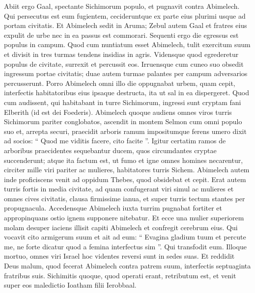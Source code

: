 \begin{biblechapter}
\begin{biblechapter}
\begin{biblechapter}
\begin{biblechapter}
\begin{biblechapter}
\begin{biblechapter}
\begin{biblechapter}
\begin{biblechapter}
\begin{biblechapter}
\verse Abiit ergo Gaal, spectante Sichimorum populo, et pugnavit contra Abimelech. 
\verse Qui persecutus est eum fugientem, cecideruntque ex parte eius plurimi usque ad portam civitatis. 
\verse Et Abimelech sedit in Aruma; Zebul autem Gaal et fratres eius expulit de urbe nec in ea passus est commorari.
 \verse Sequenti ergo die egressus est populus in campum. Quod cum nuntiatum esset Abimelech, 
\verse tulit exercitum suum et divisit in tres turmas tendens insidias in agris. Vidensque quod egrederetur populus de civitate, surrexit et percussit eos. 
\verse Irruensque cum cuneo suo obsedit ingressum portae civitatis; duae autem turmae palantes per campum adversarios percusserunt. 
 \verse Porro Abimelech omni illo die oppugnabat urbem, quam cepit, interfectis habitatoribus eius ipsaque destructa, ita ut sal in ea dispergeret.
 \verse Quod cum audissent, qui habitabant in turre Sichimorum, ingressi sunt cryptam fani Elberith (id est dei Foederis). 
\verse Abimelech quoque audiens omnes viros turris Sichimorum pariter conglobatos, 
\verse ascendit in montem Selmon cum omni populo suo et, arrepta securi, praecidit arboris ramum impositumque ferens umero dixit ad socios: “ Quod me viditis facere, cito facite ”. 
\verse Igitur certatim ramos de arboribus praecidentes sequebantur ducem, quos circumdantes cryptae succenderunt; atque ita factum est, ut fumo et igne omnes homines necarentur, circiter mille viri pariter ac mulieres, habitatores turris Sichem.
 \verse Abimelech autem inde proficiscens venit ad oppidum Thebes, quod obsidebat et cepit. 
\verse Erat autem turris fortis in media civitate, ad quam confugerant viri simul ac mulieres et omnes cives civitatis, clausa firmissime ianua, et super turris tectum stantes per propugnacula. 
\verse Accedensque Abimelech iuxta turrim pugnabat fortiter et appropinquans ostio ignem supponere nitebatur.
 \verse Et ecce una mulier superiorem molam desuper iaciens illisit capiti Abimelech et confregit cerebrum eius. 
\verse Qui vocavit cito armigerum suum et ait ad eum: “ Evagina gladium tuum et percute me, ne forte dicatur quod a femina interfectus sim ”. Qui transfodit eum. 
\verse Illoque mortuo, omnes viri Israel hoc videntes reversi sunt in sedes suas. 
\verse Et reddidit Deus malum, quod fecerat Abimelech contra patrem suum, interfectis septuaginta fratribus suis. 
 \verse Sichimitis quoque, quod operati erant, retributum est, et venit super eos maledictio Ioatham filii Ierobbaal.
 

\end{biblechapter}
\end{biblechapter}
\end{biblechapter}
\end{biblechapter}
\end{biblechapter}
\end{biblechapter}
\end{biblechapter}
\end{biblechapter}
\end{biblechapter}
